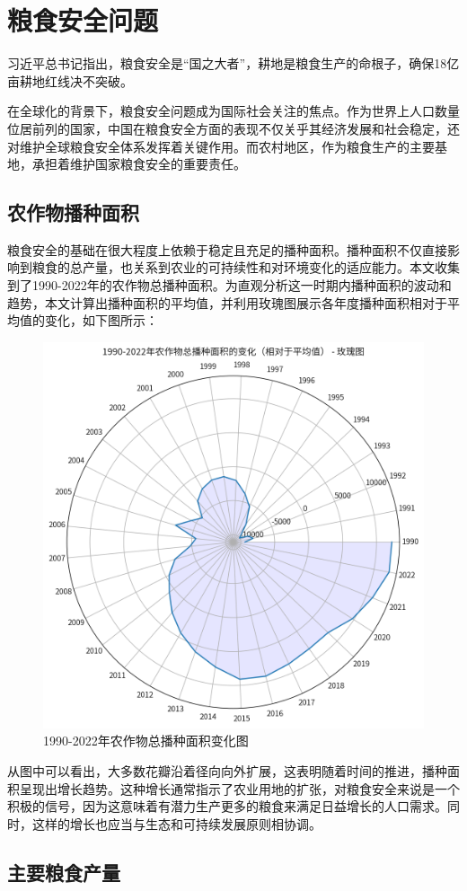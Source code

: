 \chapter{粮食安全问题}
\label{chapter:Food security problem}

习近平总书记指出，粮食安全是“国之大者”，耕地是粮食生产的命根子，确保18亿亩耕地红线决不突破。

在全球化的背景下，粮食安全问题成为国际社会关注的焦点。作为世界上人口数量位居前列的国家，中国在粮食安全方面的表现不仅关乎其经济发展和社会稳定，还对维护全球粮食安全体系发挥着关键作用。而农村地区，作为粮食生产的主要基地，承担着维护国家粮食安全的重要责任。

\section{农作物播种面积}

粮食安全的基础在很大程度上依赖于稳定且充足的播种面积。播种面积不仅直接影响到粮食的总产量，也关系到农业的可持续性和对环境变化的适应能力。本文收集到了1990-2022年的农作物总播种面积。为直观分析这一时期内播种面积的波动和趋势，本文计算出播种面积的平均值，并利用玫瑰图展示各年度播种面积相对于平均值的变化，如下图所示：
\begin{figure}[H]
    \centering
    \includegraphics[width=0.5\linewidth]{figures/5.png}
    \caption{1990-2022年农作物总播种面积变化图}
    \label{fig:Total_sown_area}
\end{figure}

从图中可以看出，大多数花瓣沿着径向向外扩展，这表明随着时间的推进，播种面积呈现出增长趋势。这种增长通常指示了农业用地的扩张，对粮食安全来说是一个积极的信号，因为这意味着有潜力生产更多的粮食来满足日益增长的人口需求。同时，这样的增长也应当与生态和可持续发展原则相协调。

\section{主要粮食产量}

